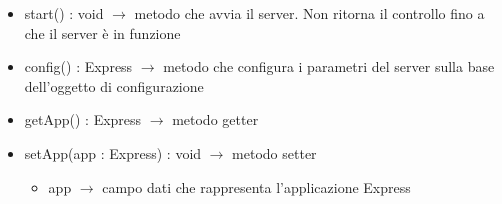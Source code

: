 \begin{description}
\begin{itemize}
	\item start() : void $\rightarrow$ metodo che avvia il server. Non ritorna il controllo fino a che il server è in funzione
	\item config() : Express $\rightarrow$ metodo che configura i parametri del server sulla base dell'oggetto di configurazione
	\item getApp() : Express $\rightarrow$ metodo getter
	\item setApp(app : Express) : void $\rightarrow$ metodo setter\begin{itemize}
		\item app $\rightarrow$ campo dati che rappresenta l'applicazione Express
	\end{itemize}
	
\end{itemize}

\end{description}

\vspace{0.5cm}
\hypertarget{server::app::Configuration}{}
